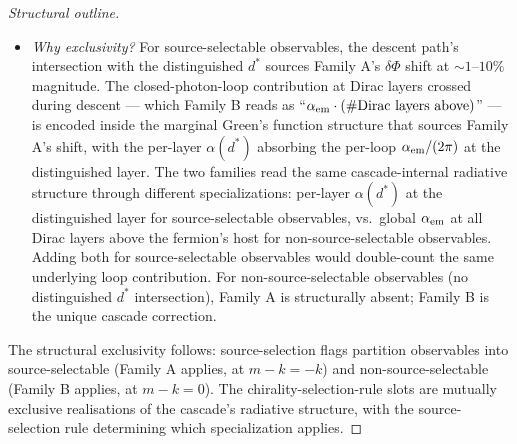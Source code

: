 \documentclass[12pt,a4paper]{article}
\begin{document}
\begin{proof}[Structural outline]
\begin{itemize}[nosep]
\item \emph{Why exclusivity?} For source-selectable observables,
the descent path's intersection with the distinguished $d^*$
sources Family A's $\delta\Phi$ shift at $\sim 1$--$10\%$
magnitude. The closed-photon-loop contribution at Dirac layers
crossed during descent --- which Family B reads as
``$\alpha_{\rm em} \cdot (\#\text{Dirac layers above})$'' --- is
encoded inside the marginal Green's function structure that
sources Family A's shift, with the per-layer $\alpha(d^*)$
absorbing the per-loop $\alpha_{\rm em}/(2\pi)$ at the distinguished
layer. The two families read the same cascade-internal radiative
structure through different specializations: per-layer $\alpha(d^*)$
at the distinguished layer for source-selectable observables, vs.\
global $\alpha_{\rm em}$ at all Dirac layers above the fermion's
host for non-source-selectable observables. Adding both for
source-selectable observables would double-count the same
underlying loop contribution. For non-source-selectable observables
(no distinguished $d^*$ intersection), Family A is structurally
absent; Family B is the unique cascade correction.
\end{itemize}
The structural exclusivity follows: source-selection flags partition
observables into source-selectable (Family A applies, at $m-k = -k$)
and non-source-selectable (Family B applies, at $m-k = 0$). The
chirality-selection-rule slots are mutually exclusive realisations
of the cascade's radiative structure, with the source-selection
rule determining which specialization applies.
\end{proof}
\end{document}
